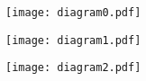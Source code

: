 \documentclass[10pt,a4paper,fleqn]{article}
\begin{document}
  \renewcommand{\labelenumi}{(\alph{enumi})}
  \renewcommand\headrule{\vspace{+2pt}\hrule}
  \newcommand{\solved}{\[\hfill\Box\]}
  \setlength{\headheight}{2.5\baselineskip}
  \pagestyle{fancyplain}

  
  \texttt{[image: diagram0.pdf]}
 
\texttt{[image: diagram1.pdf]}
 
\texttt{[image: diagram2.pdf]}
 

  
\end{document}

